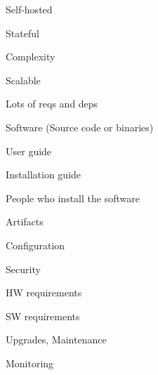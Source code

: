 \begin{iframe}
\item Self-hosted
\item Stateful
\item Complexity
\item Scalable
\item Lots of reqs and deps
\end{iframe}

\begin{iframe}[Distribution]
\item Software (Source code or binaries)
\item User guide
\item Installation guide
\item People who install the software
\end{iframe}

\begin{iframe}
\item Artifacts
\item Configuration
\item Security
\item HW requirements
\item SW requirements
\item Upgrades, Maintenance
\item Monitoring
\end{iframe}


